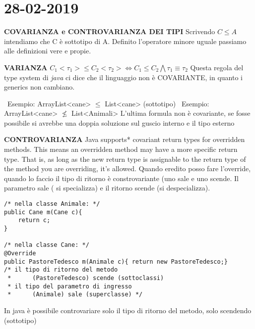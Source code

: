 

\newpage
\section{28-02-2019}
\textbf{COVARIANZA e CONTROVARIANZA DEI TIPI }\newline
Scrivendo  $C \leq A$ intendiamo che C è sottotipo di A. Definito l'operatore minore uguale passiamo alle definizioni vere e propie.

\noindent \textbf{VARIANZA} \newline
$C_{1} <\tau_{1}> \leq C_{2}<\tau_{2}> \Leftrightarrow C_{1} \leq C_{2} \bigwedge \tau_{1}\equiv \tau_{2} $
\newline
Questa regola del type system di \textit{java} ci dice che il linguaggio non è COVARIANTE, in quanto i generics non cambiano. 

\noindent \textbullet\ Esempio: ArrayList<cane> $\leq$ List<cane> (sottotipo) \newline
\textbullet\ Esempio: ArrayList<cane> $\nleq$ List<Animali> \newline
L'ultima formula non è covariante, se fosse possibile si avrebbe una doppia soluzione sul guscio interno e il tipo esterno \newline

\noindent \textbf{CONTROVARIANZA} \newline
Java supports* covariant return types for overridden methods. This means an overridden method may have a more specific return type. That is, as long as the new return type is assignable to the return type of the method you are overriding, it's allowed.\newline
Quando eredito posso fare l'override, quando lo faccio il tipo di ritorno è constrovariante (uno sale e uno scende. Il parametro sale ( si specializza) e il ritorno scende (si despecializza). 

\begin{lstlisting}[basicstyle=\small,]
/* nella classe Animale: */
public Cane m(Cane c){
	return c;
}

/* nella classe Cane: */
@Override
public PastoreTedesco m(Animale c){ return new PastoreTedesco;}
/* il tipo di ritorno del metodo 
 *		(PastoreTedesco) scende (sottoclassi)
 * il tipo del parametro di ingresso 
 * 		(Animale) sale (superclasse) */
\end{lstlisting}
In java è possibile controvariare solo il tipo di ritorno del metodo, solo scendendo (sottotipo) \newline

